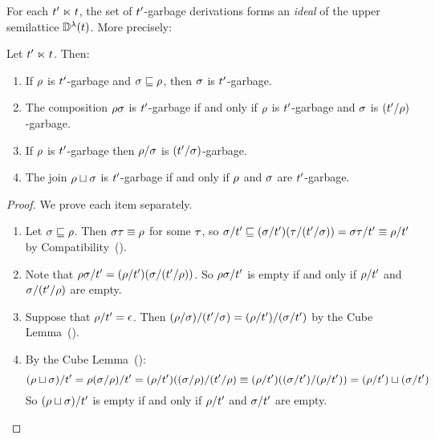 For each $t' \mathrel{\ltimes} t$, the set of $t'$-garbage derivations forms an {\em ideal} of the upper semilattice $\mathbb{D}^{\lambda}(t)$.
More precisely:
\begin{proposition}
Let $t' \mathrel{\ltimes} t$. Then:
\begin{enumerate}
\item If $\rho$ is $t'$-garbage and $\sigma \sqsubseteq \rho$, then $\sigma$ is $t'$-garbage.
  \label{properties_of_garbage__downwards_closed}
\item The composition $\rho\sigma$ is $t'$-garbage if and only if $\rho$ is $t'$-garbage and $\sigma$ is $(t'/\rho)$-garbage.
\item If $\rho$ is $t'$-garbage then $\rho/\sigma$ is $(t'/\sigma)$-garbage.
\item The join $\rho \sqcup \sigma$ is $t'$-garbage if and only if $\rho$ and $\sigma$ are $t'$-garbage.
\end{enumerate}
\end{proposition}
\begin{proof} We prove each item separately.
\begin{enumerate}
\item Let $\sigma \sqsubseteq \rho$.
      Then $\sigma\tau \equiv \rho$ for some $\tau$,
      so $\sigma/t' \sqsubseteq (\sigma/t')(\tau/(t'/\sigma)) = \sigma\tau/t' \equiv \rho/t'$
      by Compatibility~().
\item Note that $\rho\sigma/t' = (\rho/t')(\sigma/(t'/\rho))$.
      So $\rho\sigma/t'$ is empty if and only if
      $\rho/t'$ and $\sigma/(t'/\rho)$ are empty.
\item Suppose that $\rho/t' = \epsilon$.
      Then $(\rho/\sigma)/(t'/\sigma) = (\rho/t')/(\sigma/t')$
      by the Cube Lemma~().
\item By the Cube Lemma~():
\[(\rho \sqcup \sigma)/t' = \rho(\sigma/\rho)/t' =
      (\rho/t')((\sigma/\rho)/(t'/\rho) \equiv
      (\rho/t')((\sigma/t')/(\rho/t')) =
    (\rho/t') \sqcup (\sigma/t')\]
      So $(\rho \sqcup \sigma)/t'$ is empty if and only if
      $\rho/t'$ and $\sigma/t'$ are empty.
\end{enumerate}
\end{proof}

